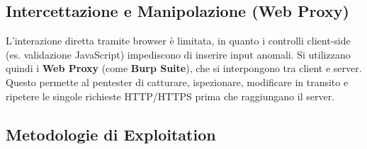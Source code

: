 \documentclass[12pt, a4paper]{report}
\begin{document}
\subsection{Intercettazione e Manipolazione (Web Proxy)}
L'interazione diretta tramite browser è limitata, in quanto i controlli client-side (es. validazione JavaScript) impediscono di inserire input anomali. Si utilizzano quindi i \textbf{Web Proxy} (come \textbf{Burp Suite}), che si interpongono tra client e server. Questo permette al pentester di catturare, ispezionare, modificare in transito e ripetere le singole richieste HTTP/HTTPS prima che raggiungano il server.

\subsection{Metodologie di Exploitation}
\end{document}
